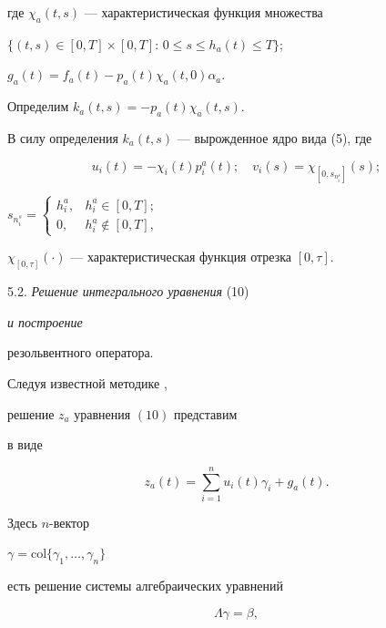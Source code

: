 где $\chi_a (t,s)$ --- характеристическая функция множества


$\{(t,s) \in [0,T] \times [0,T]: \, 0 \le s \le h_a(t) \le T \}$;


$g_a(t) =f_a(t) - p_a(t) \chi_a (t,0) \alpha_a$.


Определим $k_a(t,s) = -p_a(t) \chi_a(t,s)$.


В силу определения $k_a(t,s)$ --- вырожденное ядро вида (5), где


%


\begin{equation}


u_i(t) =-\chi_i(t)  p_i^a(t); \quad


v_i(s) = \chi_{[0, s_{n_i^s}]}(s);


\end{equation}


%


$s_{n_i^s}=


\begin{cases}


h_i^a, & h_i^a \in [0,T]; \\


0, & h_i^a \notin [0,T],


\end{cases}$


$\chi_{[0,\tau]}(\cdot )$ --- характеристическая функция отрезка $[0,\tau]$.





5.2. {\it Решение интегрального уравнения} (10) {\it и построение


резольвентного оператора.}


Следуя известной методике \cite{Zab},


решение $z_a$ уравнения $(10)$ представим


в виде


%


$$


z_a(t) = \sum_{i=1}^{n} u_i(t) \gamma_i + g_a(t).


$$


%


Здесь $n$-вектор 


$\gamma = {\mathrm {col}}\{ \gamma_1, \dotsc,\gamma_{n}\}$


есть решение системы алгебраических уравнений


%


\begin{equation}


\Lambda  \gamma  =  \beta,


\end{equation}



